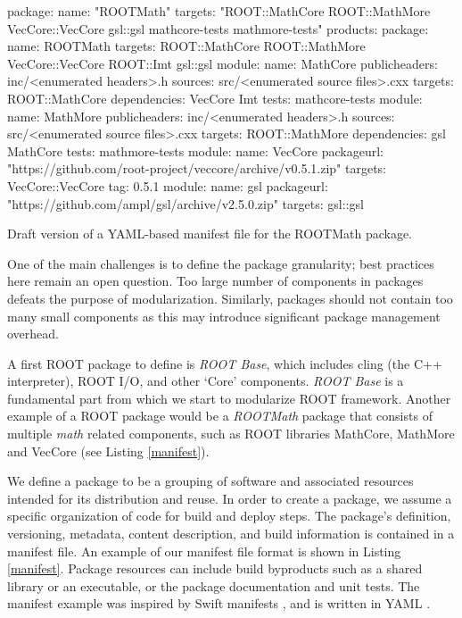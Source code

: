\documentclass{webofc}
\begin{document}
\begin{listing}[h]
\noindent
\begin{minipage}[h]{.7\textwidth}

\begin{cppcode*}{}
  package:
    name: "ROOTMath"
    targets: "ROOT::MathCore ROOT::MathMore VecCore::VecCore gsl::gsl mathcore-tests 
            mathmore-tests"
    products:
      package:
      name: ROOTMath
      targets: ROOT::MathCore ROOT::MathMore VecCore::VecCore ROOT::Imt gsl::gsl
    module:
      name: MathCore
      publicheaders: inc/<enumerated headers>.h
      sources: src/<enumerated source files>.cxx
      targets: ROOT::MathCore
      dependencies: VecCore Imt
      tests: mathcore-tests
    module:
      name: MathMore
      publicheaders: inc/<enumerated headers>.h
      sources: src/<enumerated source files>.cxx
      targets: ROOT::MathMore
      dependencies: gsl MathCore
      tests: mathmore-tests
    module:
      name: VecCore
      packageurl: "https://github.com/root-project/veccore/archive/v0.5.1.zip"
      targets: VecCore::VecCore
      tag: 0.5.1
    module:
      name: gsl
      packageurl: "https://github.com/ampl/gsl/archive/v2.5.0.zip"
      targets: gsl::gsl
 \end{cppcode*}
 \end{minipage}
 \caption{Draft version of a YAML-based manifest file for the ROOTMath package.}
 \label{manifest}
\end{listing}


One of the main challenges is to define the package granularity; best practices here remain an open question.  Too large number of components in packages defeats the purpose of modularization. Similarly, packages should not contain too many small components as this may introduce significant package management overhead.

A first ROOT package to define is \textit{ROOT Base}, which includes cling (the C++ interpreter), ROOT I/O, and other `Core' components.  \textit{ROOT Base} is a fundamental part from which we start to modularize ROOT framework. Another example of a ROOT package would be a  \textit{ROOTMath} package that consists of multiple  \textit{math} related components, such as ROOT libraries MathCore, MathMore and VecCore (see Listing \ref{manifest}). %

We define a package to be a grouping of software and associated resources intended for its distribution and reuse. In order to create a package, we assume a specific organization of code for build and deploy steps. The package's definition, versioning, metadata, content description, and build information is contained in a manifest file.  An example of our manifest file format is shown in Listing \ref{manifest}.  Package resources can include build byproducts such as a shared library or an executable, or the package documentation and unit tests.
The manifest example was inspired by Swift manifests \cite{swift}, and is written in YAML \cite{yaml}.
\end{document}
